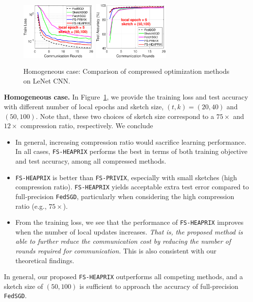 \documentclass[11pt]{article}
\begin{document}
\begin{figure}[t]
\begin{center}
{		\includegraphics[width=1.5in]{MNIST_figures/local5_sketch50_iid1_train_loss.eps}\hspace{-0.12in}
		\includegraphics[width=1.5in]{MNIST_figures/local5_sketch50_iid1_test_acc.eps}
		}
	\end{center}
	\vspace{-0.1in}
	\caption{Homogeneous case: Comparison of compressed optimization methods on LeNet CNN.}
    \label{fig:MNIST-iid1}
    \vspace{-0.1in}
\end{figure}

\textbf{Homogeneous case.} In Figure~\ref{fig:MNIST-iid1}, we provide the training loss and test accuracy with different number of local epochs and sketch size, $(t,k)=(20,40)$ and $(50,100)$. 
Note that, these two choices of sketch size correspond to a $75\times$ and $12\times$ compression ratio, respectively. We conclude
\begin{itemize}
    \item In general, increasing compression ratio would sacrifice learning performance. In all cases, \texttt{FS-HEAPRIX} performs the best in terms of both training objective and test accuracy, among all compressed methods.
    
    \item \texttt{FS-HEAPRIX} is better than \texttt{FS-PRIVIX}, especially with small sketches (high compression ratio). \texttt{FS-HEAPRIX} yields acceptable extra test error compared to full-precision \texttt{FedSGD}, particularly when considering the high compression ratio (e.g., $75\times$). 
    
    \item From the training loss, we see that the performance of \texttt{FS-HEAPRIX} improves when the number of local updates increases. \emph{That is, the proposed method is able to further reduce the communication cost by reducing the number of rounds required for communication.} This is also consistent with our theoretical findings. 
\end{itemize}
In general, our proposed \texttt{FS-HEAPRIX} outperforms all competing methods, and a sketch size of $(50,100)$ is sufficient to approach the accuracy of full-precision \texttt{FedSGD}.
\end{document}
